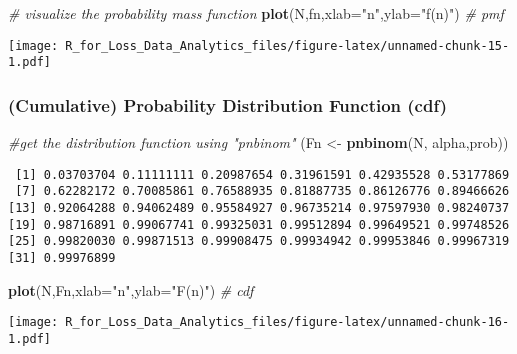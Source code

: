 \documentclass[]{book}
\newenvironment{Shaded}{\begin{snugshade}}{\end{snugshade}}
\newcommand{\KeywordTok}[1]{\textcolor[rgb]{0.13,0.29,0.53}{\textbf{#1}}}
\newcommand{\DataTypeTok}[1]{\textcolor[rgb]{0.13,0.29,0.53}{#1}}
\newcommand{\StringTok}[1]{\textcolor[rgb]{0.31,0.60,0.02}{#1}}
\newcommand{\CommentTok}[1]{\textcolor[rgb]{0.56,0.35,0.01}{\textit{#1}}}
\newcommand{\NormalTok}[1]{#1}
\theoremstyle{definition}
\theoremstyle{definition}
\theoremstyle{definition}
\theoremstyle{remark}
\begin{document}
\begin{Shaded}
\begin{Highlighting}[]
\CommentTok{# visualize the probability mass function}
\KeywordTok{plot}\NormalTok{(N,fn,}\DataTypeTok{xlab=}\StringTok{"n"}\NormalTok{,}\DataTypeTok{ylab=}\StringTok{"f(n)"}\NormalTok{) }\CommentTok{# pmf}
\end{Highlighting}
\end{Shaded}

\texttt{[image: R\_for\_Loss\_Data\_Analytics\_files/figure-latex/unnamed-chunk-15-1.pdf]}

\subsubsection{(Cumulative) Probability Distribution Function
(cdf)}\label{cumulative-probability-distribution-function-cdf-1}

\begin{Shaded}
\begin{Highlighting}[]
\CommentTok{#get the distribution function using "pnbinom"}
\NormalTok{(Fn <-}\StringTok{ }\KeywordTok{pnbinom}\NormalTok{(N, alpha,prob))}
\end{Highlighting}
\end{Shaded}

\begin{verbatim}
 [1] 0.03703704 0.11111111 0.20987654 0.31961591 0.42935528 0.53177869
 [7] 0.62282172 0.70085861 0.76588935 0.81887735 0.86126776 0.89466626
[13] 0.92064288 0.94062489 0.95584927 0.96735214 0.97597930 0.98240737
[19] 0.98716891 0.99067741 0.99325031 0.99512894 0.99649521 0.99748526
[25] 0.99820030 0.99871513 0.99908475 0.99934942 0.99953846 0.99967319
[31] 0.99976899
\end{verbatim}

\begin{Shaded}
\begin{Highlighting}[]
\KeywordTok{plot}\NormalTok{(N,Fn,}\DataTypeTok{xlab=}\StringTok{"n"}\NormalTok{,}\DataTypeTok{ylab=}\StringTok{"F(n)"}\NormalTok{) }\CommentTok{# cdf}
\end{Highlighting}
\end{Shaded}

\texttt{[image: R\_for\_Loss\_Data\_Analytics\_files/figure-latex/unnamed-chunk-16-1.pdf]}
\end{document}
